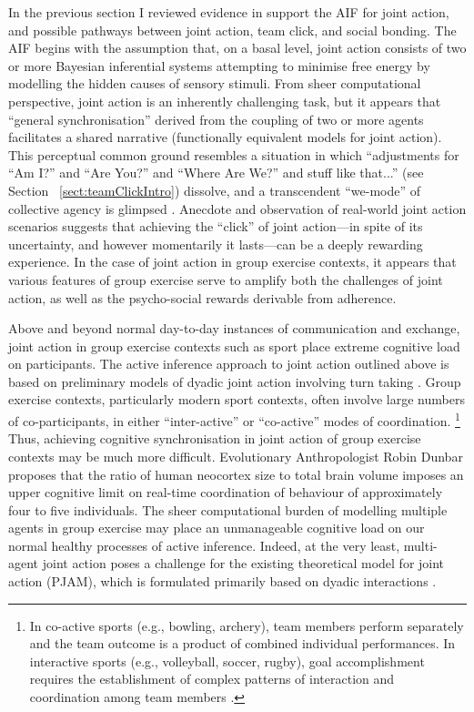 \begin{CJK}{UTF8}{gbsn}
In the previous section I reviewed evidence in support the AIF for joint action, and possible pathways between joint action, team click, and social bonding.  The AIF begins with the assumption that, on a basal level, joint action consists of two or more Bayesian inferential systems attempting to minimise free energy by modelling the hidden causes of sensory stimuli.  From sheer computational perspective, joint action is an inherently challenging task, but it appears that ``general synchronisation'' derived from the coupling of two or more agents facilitates a shared narrative (functionally equivalent models for joint action).  This perceptual common ground resembles a situation in which ``adjustments for ``Am I?'' and ``Are You?'' and ``Where Are We?'' and stuff like that...'' (see Section ~\ref{sect:teamClickIntro}) dissolve, and a transcendent ``we-mode'' of collective agency is glimpsed \citep[][]{Friston2015}.  Anecdote and observation of real-world joint action scenarios suggests that achieving the ``click'' of joint action---in spite of its uncertainty, and however momentarily it lasts---can be a deeply rewarding experience.  In the case of joint action in group exercise contexts, it appears that various features of group exercise serve to amplify both the challenges of joint action, as well as the psycho-social rewards derivable from adherence.

Above and beyond normal day-to-day instances of communication and exchange, joint action in group exercise contexts such as sport place extreme cognitive load on participants. The active inference approach to joint action outlined above is based on preliminary models of dyadic joint action involving turn taking \citep[i.e., in bird song exchanges][]{Friston2015}.  Group exercise contexts, particularly modern sport contexts, often involve large numbers of co-participants, in either ``inter-active'' or ``co-active'' modes of coordination.
    \footnote{
    In co-active sports (e.g., bowling, archery), team members perform separately and the team outcome is a product of combined individual performances. In interactive sports (e.g., volleyball, soccer, rugby), goal accomplishment requires the establishment of complex patterns of interaction and coordination among team members \citep{Filho2014}.
    }
Thus, achieving cognitive synchronisation in joint action of group exercise contexts may be much more difficult.  Evolutionary Anthropologist Robin Dunbar \textcite{Dunbar1992} proposes that the ratio of human neocortex size to total brain volume imposes an upper cognitive limit on real-time coordination of behaviour of approximately four to five individuals.  The sheer computational burden of modelling multiple agents in group exercise may place an unmanageable cognitive load on our normal healthy processes of active inference.  Indeed, at the very least, multi-agent joint action poses a challenge for the existing theoretical model for joint action (PJAM), which is formulated primarily based on dyadic interactions \citep{Pesquita2017}.


\end{CJK}

